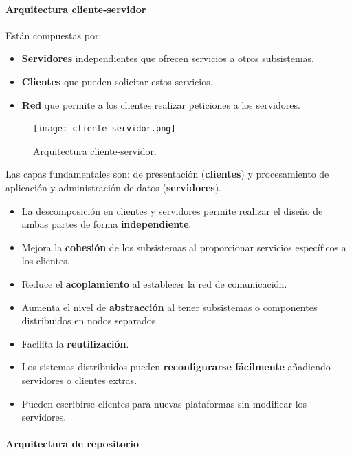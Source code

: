 \documentclass[12pt,spanish]{article}
\begin{document}
\paragraph{Arquitectura cliente-servidor\\}

Están compuestas por:

\begin{itemize}
	\item \textbf{Servidores} independientes que ofrecen servicios a otros subsistemas.
	\item \textbf{Clientes} que pueden solicitar estos servicios.
	\item \textbf{Red} que permite a los clientes realizar peticiones a los servidores.
\end{itemize}

\begin{figure}[H]
\centering
\texttt{[image: cliente-servidor.png]}
\caption{Arquitectura cliente-servidor.}
\end{figure}

Las capas fundamentales son: de presentación (\textbf{clientes}) y procesamiento de aplicación y administración de datos (\textbf{servidores}).

\begin{itemize}
	\item La descomposición en clientes y servidores permite realizar el diseño de ambas partes de forma \textbf{independiente}.
	\item Mejora la \textbf{cohesión} de los subsistemas al proporcionar servicios específicos a los clientes.
	\item Reduce el \textbf{acoplamiento} al establecer la red de comunicación.
	\item Aumenta el nivel de \textbf{abstracción} al tener subsistemas o componentes distribuidos en nodos separados.
	\item Facilita la \textbf{reutilización}.
	\item Los sistemas distribuidos pueden \textbf{reconfigurarse fácilmente} añadiendo servidores o clientes extras.
	 \item Pueden escribirse clientes para nuevas plataformas sin modificar los servidores.
\end{itemize}

\paragraph{Arquitectura de repositorio\\}
\end{document}
